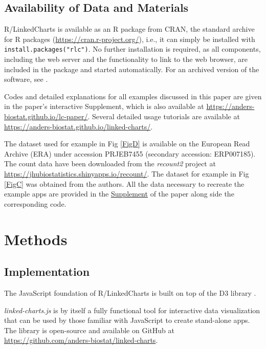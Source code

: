 \documentclass[twocolumn,10pt]{article}
\newcommand{\Supplement}{\href{https://anders-biostat.github.io/lc-paper/}{Supplement}}
\begin{document}
\subsection{Availability of Data and Materials}

R/LinkedCharts is available as an R package from CRAN, the standard archive for R packages (\url{https://cran.r-project.org/}), i.e., it can simply be installed with \texttt{install.packages("rlc")}. No further installation is required, as all components, including the web server and the functionality to link to the web browser, are included in the package and started automatically. For an archived version of the software, see \cite{rlc_2023}.

Codes and detailed explanations for all examples discussed in this paper are given in the paper's interactive Supplement, which is also available at \url{https://anders-biostat.github.io/lc-paper/}. Several detailed usage tutorials are available at \url{https://anders-biostat.github.io/linked-charts/}.

The dataset used for example in Fig \ref{FigD} is available on the European Read Archive (ERA) under accession PRJEB7455 (secondary accession: ERP007185). The count data have been downloaded from the \emph{recount2} project \citep{collado_2017} at \url{https://jhubiostatistics.shinyapps.io/recount/}. The dataset for example in Fig \ref{FigC} was obtained from the authors. All the data necessary to recreate the example apps are provided in the \Supplement{} of the paper along side the corresponding code.


\section{Methods}

\subsection{Implementation}

The JavaScript foundation of R/LinkedCharts is built on top of the D3 library \citep{bostock_2011}. 

\emph{linked-charts.js} is by itself a fully functional tool for interactive data visualization that can be used by those familiar with JavaScript to create stand-alone apps. The library is open-source and available on GitHub at \url{https://github.com/anders-biostat/linked-charts}. %
\end{document}
